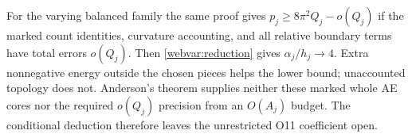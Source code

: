 For the varying balanced family the same proof gives
$p_j\ge8\pi^2Q_j-o(Q_j)$ if the marked count identities, curvature
accounting, and all relative boundary terms have total errors
$o(Q_j)$.  Then \eqref{webvar:reduction} gives $\alpha_j/h_j\to4$.
Extra nonnegative energy outside the chosen pieces helps the lower
bound; unaccounted topology does not.  Anderson's theorem supplies
neither these marked whole AE cores nor the required $o(Q_j)$
precision from an $O(A_j)$ budget.  The conditional deduction
therefore leaves the unrestricted O11 coefficient open.
